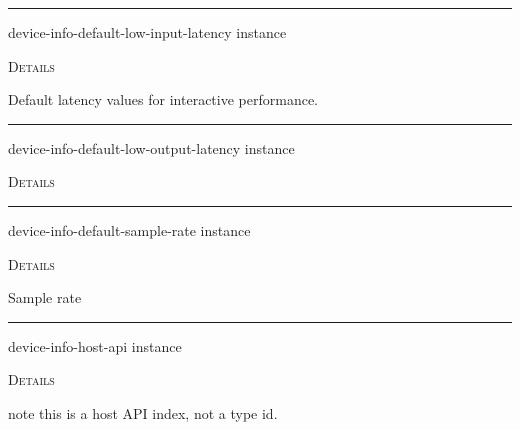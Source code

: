 \documentclass[a4paper]{report}
\begin{document}
  

    \rule{\linewidth}{0.1mm}
    
    \label{portaudio__fun__device-info-default-low-input-latency}
    \begin{defun}[Function]
    device-info-default-low-input-latency instance


	
    \bigskip
    \textsc{Details}

Default latency values for interactive performance.


    
    \end{defun}
  
  

    \rule{\linewidth}{0.1mm}
    
    \label{portaudio__fun__device-info-default-low-output-latency}
    \begin{defun}[Function]
    device-info-default-low-output-latency instance


	
    \bigskip
    \textsc{Details}




    
    \end{defun}
  
  

    \rule{\linewidth}{0.1mm}
    
    \label{portaudio__fun__device-info-default-sample-rate}
    \begin{defun}[Function]
    device-info-default-sample-rate instance


	
    \bigskip
    \textsc{Details}

Sample rate


    
    \end{defun}
  
  

    \rule{\linewidth}{0.1mm}
    
    \label{portaudio__fun__device-info-host-api}
    \begin{defun}[Function]
    device-info-host-api instance


	
    \bigskip
    \textsc{Details}

note this is a host API index, not a type id.


    
    \end{defun}
  
\end{document}

